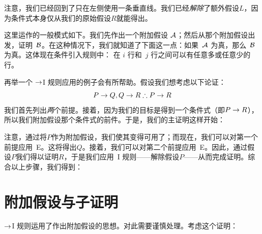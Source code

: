 \begin{fitchproof}
        \PR
        \open
            \AS
            \close
    \end{fitchproof}


注意，我们已经回到了只在左侧使用一条垂直线。我们已经\emph{解除}了额外假设$L$，因为条件式本身仅从我们的原始假设$R$就能得出。

这里运作的一般模式如下。我们先作出一个附加假设 $\mathcal{A}$；然后从那个附加假设出发，证明~$\mathcal{B}$。在这种情况下，我们就知道了下面这一点：如果~$\mathcal{A}$ 为真，那么~$\mathcal{B}$ 为真。这体现在条件引入规则中：
在 $i$ 行和~$j$ 行之间可以有任意多或任意少的行。

再举一个 $\rightarrow$I 规则应用的例子会有所帮助。假设我们想考虑以下论证：
	$$P \eif Q, Q \eif R \therefore P \eif R$$
我们首先列出\emph{两}个前提。接着，因为我们的目标是得到一个条件式（即$P \rightarrow R$），所以我们附加假设那个条件式的前件。于是，我们的主证明这样开始：


\begin{fitchproof}
	\PR
	\PR
	\open
		\AS
	\close
\end{fitchproof}


注意，通过将$P$作为附加假设，我们使其变得可用了；而现在，我们可以对第一个前提应用~{\eif}E。这将得出$Q$。接着，我们可以对第二个前提应用~{\eif}E。因此，通过假设$P$我们得以证明$R$，于是我们应用~{\eif}I 规则——解除假设$P$——从而完成证明。综合以上步骤，我们得到：
\label{HSproof}


\begin{fitchproof}
	\PR
	\PR
	\open
		\AS
	\close
\end{fitchproof}

\section{附加假设与子证明}
$\rightarrow$I 规则运用了作出附加假设的思想。对此需要谨慎处理。考虑这个证明：


